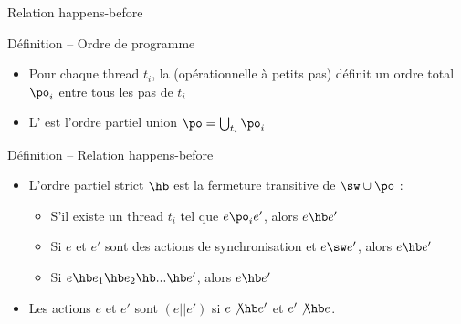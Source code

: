 
\begingroup

\begin{frame}{Relation happens-before}

  \begin{block}{Définition -- Ordre de programme}
    \begin{itemize}
    \item Pour chaque thread $t_i$, la  (opérationnelle à petits pas)
      définit un \alert{ordre total} $\po_i$ entre tous les pas de $t_i$
    \item L' est l'\alert{ordre partiel} union $\po = \bigcup_{t_i} \po_i$
    \end{itemize}
  \end{block}

  \pause
  
  \begin{block}{Définition -- Relation happens-before}
    \begin{itemize}
    \item     L'\alert{ordre partiel strict} $\hb$ est la fermeture transitive de $\sw \cup \po$ :
      \begin{itemize}
      \item S'il existe un thread $t_i$ tel que $e \po_i e'$, alors $e \hb e'$
      \item Si $e$ et $e'$ sont des actions de synchronisation et $e \sw e'$, alors $e \hb e'$
      \item Si $e \hb e_1 \hb e_2 \hb ... \hb e'$, alors $e \hb e'$
      \end{itemize}
    \item  Les actions $e$ et $e'$ sont  $(e || e')$ si $e\not\hb e'$ et $e'\not\hb e$.
    \end{itemize}
  \end{block}
  
\end{frame}

\endgroup
\endinput
